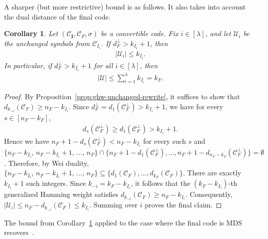 \documentclass[conference, 10pt]{IEEEtran}
\theoremstyle{plain}
\newtheorem{corollary}[theorem]{Corollary}
\theoremstyle{definition}
\newcommand{\C}{\mathtt{C}}
\newcommand{\mC}{\mathcal{C}}
\newcommand{\mU}{\mathcal{U}}
\begin{document}
A sharper (but more restrictive) bound is as follows. It also takes into account the dual distance of the final code.

\begin{corollary}\label{cor:unchanged2}
Let $(\mC_{\textbf{I}},\mC_F,\sigma)$ be a convertible code. Fix $i\in [\lambda]$, and let $\mU_i$ be the unchanged symbols from $\mC_{I_i}$. If $d_F^\perp>k_{I_i}+1$, then
\begin{align*} |\mU_i|\le k_{I_i}. \end{align*}
In particular, if $d_F^\perp>k_{I_i}+1$ for all $i\in [\lambda]$, then
\begin{align*} |\mU|\le \sum_{i=1}^{\lambda} k_{I_i}=k_F. \end{align*}
\end{corollary}

\begin{proof}
By Proposition~\ref{prop:ghw-unchanged-rewrite}, it suffices to show that $d_{k_{-i}}(\mC_F)\ge n_F-k_{I_i}.$
Since $d_F^\perp=d_1(\mC_F^\perp)>k_{I_i}+1$, we have for every $s\in [n_F-k_F]$,
\begin{align*} d_s(\mC_F^\perp)\ge d_1(\mC_F^\perp)>k_{I_i}+1. \end{align*}
Hence we have
$n_F+1-d_s(\mC_F^\perp) < n_F-k_{I_i}$ for every such $s$ and $\{n_F-k_{I_i},\, n_F-k_{I_i}+1,\,\dots,\, n_F\} \cap  \{n_F+1-d_1(\mC_F^\perp),\dots,n_F+1-d_{n_F-k_F}(\mC_F^\perp)\} = \emptyset$. Therefore, by Wei duality,  $\{n_F-k_{I_i},\, n_F-k_{I_i}+1,\,\dots,\, n_F\}  \subseteq \{d_1(\mC_F),\dots,d_{k_F}(\mC_F)\}.$ 
There are exactly $k_{I_i}+1$ such integers. Since $k_{-i}=k_F-k_{I_i}$, it follows that the $(k_F-k_{I_i})$-th generalized Hamming weight satisfies
$d_{k_{-i}}(\mC_F)\ge n_F-k_{I_i}.$ 
Consequently, $|\mU_i|\le n_F-d_{k_{-i}}(\mC_F)\le k_{I_i}.$
Summing over $i$ proves the final claim.
\end{proof}


The bound from Corollary~\ref{cor:unchanged2} applied to the case where the final code is MDS recovers~\cite[Lemma 11]{maturana2022convertible}.
\end{document}
